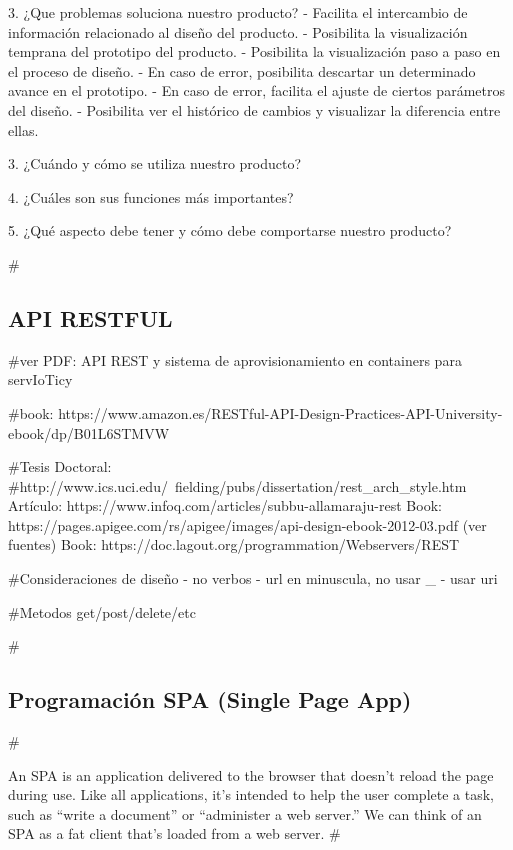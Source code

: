 3. ¿Que problemas soluciona nuestro producto?
- Facilita el intercambio de información relacionado al diseño del producto.
- Posibilita la visualización temprana del prototipo del producto.
- Posibilita la visualización paso a paso en el proceso de diseño.
- En caso de error, posibilita descartar un determinado avance en el prototipo.
- En caso de error, facilita el ajuste de ciertos parámetros del diseño.
- Posibilita ver el histórico de cambios y visualizar la diferencia entre ellas.

3. ¿Cuándo y cómo se utiliza nuestro producto?

4. ¿Cuáles son sus funciones más importantes? 

5. ¿Qué aspecto debe tener y cómo debe comportarse nuestro producto?



#\subsection{API RESTFUL}
#ver PDF: API REST y sistema de aprovisionamiento en containers para servIoTicy

#book: https://www.amazon.es/RESTful-API-Design-Practices-API-University-ebook/dp/B01L6STMVW

#Tesis Doctoral: #http://www.ics.uci.edu/~fielding/pubs/dissertation/rest_arch_style.htm
Artículo: https://www.infoq.com/articles/subbu-allamaraju-rest
Book: https://pages.apigee.com/rs/apigee/images/api-design-ebook-2012-03.pdf (ver fuentes)
Book: https://doc.lagout.org/programmation/Webservers/REST%

#Consideraciones de diseño 
  - no verbos
  - url en minuscula, no usar _ 
  - usar uri
  
#Metodos get/post/delete/etc


#\subsection{Programación SPA (Single Page App)}

#\begin{displayquote}
An SPA is an application delivered to the browser that doesn’t reload the page during use. Like all applications, it’s intended to help the user complete a task, such as “write a document” or “administer a web server.” We can think of an SPA as a fat client that’s loaded from a web server. \cite{Mikowski2015}
#\end{displayquote}

